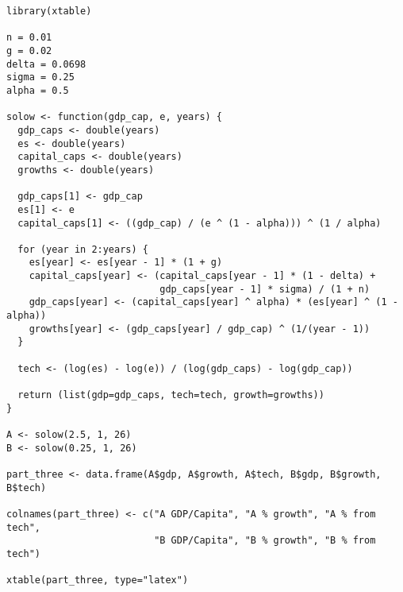 \documentclass[12pt,letterpaper]{article}
\theoremstyle{definition}
\begin{document}
\begin{footnotesize}
\begin{verbatim}
library(xtable)

n = 0.01
g = 0.02
delta = 0.0698
sigma = 0.25
alpha = 0.5

solow <- function(gdp_cap, e, years) {
  gdp_caps <- double(years)
  es <- double(years)
  capital_caps <- double(years)
  growths <- double(years)

  gdp_caps[1] <- gdp_cap
  es[1] <- e
  capital_caps[1] <- ((gdp_cap) / (e ^ (1 - alpha))) ^ (1 / alpha)

  for (year in 2:years) {
    es[year] <- es[year - 1] * (1 + g)
    capital_caps[year] <- (capital_caps[year - 1] * (1 - delta) +
                           gdp_caps[year - 1] * sigma) / (1 + n)
    gdp_caps[year] <- (capital_caps[year] ^ alpha) * (es[year] ^ (1 - alpha))
    growths[year] <- (gdp_caps[year] / gdp_cap) ^ (1/(year - 1))
  }

  tech <- (log(es) - log(e)) / (log(gdp_caps) - log(gdp_cap))

  return (list(gdp=gdp_caps, tech=tech, growth=growths))
}

A <- solow(2.5, 1, 26)
B <- solow(0.25, 1, 26)

part_three <- data.frame(A$gdp, A$growth, A$tech, B$gdp, B$growth, B$tech)

colnames(part_three) <- c("A GDP/Capita", "A % growth", "A % from tech",
                          "B GDP/Capita", "B % growth", "B % from tech")

xtable(part_three, type="latex")
\end{verbatim}
\end{footnotesize}
\end{document}
